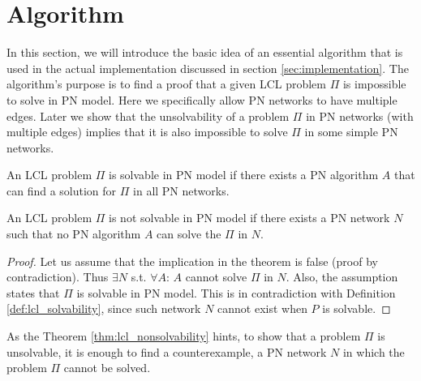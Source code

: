 
\section{Algorithm} \label{sec:algorithm}

In this section, we will introduce the basic idea of an essential algorithm that is used in the actual implementation discussed in section \ref{sec:implementation}.
The algorithm's purpose is to find a proof that a given LCL problem $\Pi$ is impossible to solve in PN model.
Here we specifically allow PN networks to have multiple edges.
Later we show that the unsolvability of a problem $\Pi$ in PN networks (with multiple edges) implies that it is also impossible to solve $\Pi$ in some simple PN networks.

\begin{definition} \label{def:lcl_solvability}
    An LCL problem $\Pi$ is solvable in PN model if there exists a PN algorithm $A$ that can find a solution for $\Pi$ in all PN networks.
\end{definition}

\begin{theorem} \label{thm:lcl_nonsolvability}
    An LCL problem $\Pi$ is not solvable in PN model if there exists a PN network $N$ such that no PN algorithm $A$ can solve the $\Pi$ in $N$.
\end{theorem}
\begin{proof}
    Let us assume that the implication in the theorem is false (proof by contradiction).
    Thus $\exists N$ s.t. $\forall A$: $A$ cannot solve $\Pi$ in $N$.
    Also, the assumption states that $\Pi$ is solvable in PN model.
    This is in contradiction with Definition \ref{def:lcl_solvability}, since such network $N$ cannot exist when $P$ is solvable.
\end{proof}

As the Theorem \ref{thm:lcl_nonsolvability} hints, to show that a problem $\Pi$ is unsolvable, it is enough to find a counterexample, a PN network $N$ in which the problem $\Pi$ cannot be solved.

